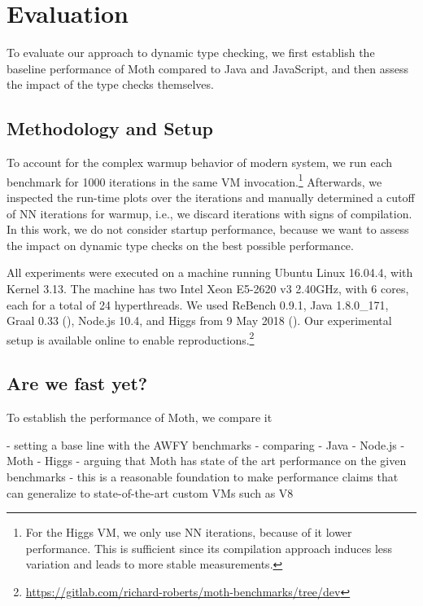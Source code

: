 
\section{Evaluation}
\label{sec:evaluation}


To evaluate our approach to dynamic type checking,
we first establish the baseline performance of Moth
compared to Java and JavaScript,
and then assess the impact of the type checks themselves.

\subsection{Methodology and Setup}

To account for the complex warmup behavior
of modern system\citep{Barrett:2017:VMW},
we run each benchmark for 1000 iterations in the same
VM invocation.\footnote{
For the Higgs VM, we only use NN iterations,
because of it lower performance.
This is sufficient since its compilation approach induces less variation
and leads to more stable measurements.}
Afterwards, we inspected the run-time plots over the iterations
and manually determined a cutoff of NN iterations for warmup,
i.e., we discard iterations with signs of compilation.
In this work, we do not consider startup performance,
because we want to assess the impact on dynamic type checks
on the best possible performance.

All experiments were executed on a machine running Ubuntu Linux 16.04.4,
with Kernel 3.13.
The machine has two Intel Xeon E5-2620 v3 2.40GHz,
with 6 cores, each for a total of 24 hyperthreads.
We used ReBench 0.9.1, Java 1.8.0\_171, Graal 0.33 (),
Node.js 10.4, and Higgs from 9 May 2018 ().
Our experimental setup is available online to enable reproductions.\footnote{
\url{https://gitlab.com/richard-roberts/moth-benchmarks/tree/dev}}


\subsection{Are we fast yet?}
\label{sec:baseline-perf}

To establish the performance of Moth,
we compare it 
\citep{Marr2016}

\begin{cnote}
- setting a base line with the AWFY benchmarks
- comparing
  - Java
  - Node.js
  - Moth
  - Higgs
- arguing that Moth has state of the art performance on the given benchmarks
- this is a reasonable foundation to make performance claims
  that can generalize to state-of-the-art custom VMs such as V8
\end{cnote}

